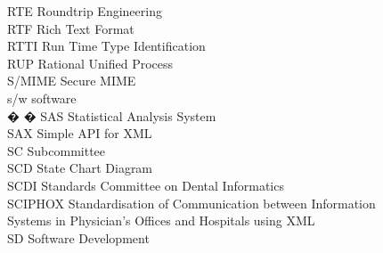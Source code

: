 \begin{tabbing}

    \>RTE \>\>Roundtrip Engineering\\

    \>RTF \>\>Rich Text Format\\


    \>RTTI \>\>Run Time Type Identification\\


    \>RUP \>\>Rational Unified Process\\


    \>S/MIME \>\>Secure MIME\\

    \>s/w \>\>software\\


� � \>SAS \>\>Statistical Analysis System\\



    \>SAX \>\>Simple API for XML\\

    \>SC \>\>Subcommittee\\

    \>SCD \>\>State Chart Diagram\\

    \>SCDI \>\>Standards Committee on Dental Informatics\\

    \>SCIPHOX \>\>Standardisation of Communication between Information\\
        \>\>\>Systems in Physician's Offices and Hospitals using XML\\


    \>SD \>\>Software Development\\


\end{tabbing}
